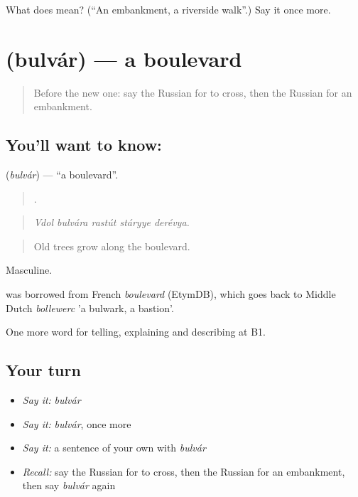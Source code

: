\begin{tcolorbox}[breakable,colback=teal!4,colframe=teal!35!black,title={Before you move on}]
What does  mean? (\textquotedblleft{}An embankment, a riverside walk\textquotedblright{}.) Say it once more.
\end{tcolorbox}
\section[\texorpdfstring{\ru{бульвар} (bulvár)}{бульвар (bulvár)}]{ (bulvár) — a boulevard}

\label{lesson:RU-C440-bulvar}



\begin{quote}
Before the new one: say the Russian for to cross, then the Russian for an embankment.
\end{quote}

\subsection*{You'll want to know: }
\textbf{} (\emph{bulvár}) — \textquotedblleft{}a boulevard\textquotedblright{}.

\begin{quote}
    .
\end{quote}

\begin{quote}
\emph{Vdol bulvára rastút stáryye derévya.}
\end{quote}

\begin{quote}
Old trees grow along the boulevard.
\end{quote}

Masculine.

\begin{cousinweb}
\emph{} was borrowed from French \emph{boulevard} (EtymDB), which goes back to Middle Dutch \emph{bollewerc} 'a bulwark, a bastion'.
\end{cousinweb}

\begin{grammarlens}[title={What you've built}]
One more word for telling, explaining and describing at B1.
\end{grammarlens}

\subsection*{Your turn}
\begin{itemize}
\raggedright
  \item \emph{Say it:} \emph{bulvár}
  \item \emph{Say it:} \emph{bulvár}, once more
  \item \emph{Say it:} a sentence of your own with \emph{bulvár}
  \item \emph{Recall:} say the Russian for to cross, then the Russian for an embankment, then say \emph{bulvár} again
\end{itemize}

